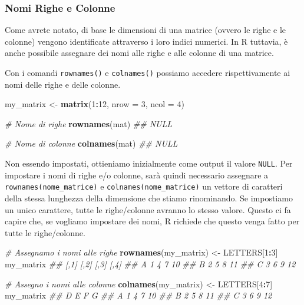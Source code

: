 \documentclass[
]{book}
\newenvironment{Shaded}{\begin{snugshade}}{\end{snugshade}}
\newcommand{\CommentTok}[1]{\textcolor[rgb]{0.56,0.35,0.01}{\textit{#1}}}
\newcommand{\DataTypeTok}[1]{\textcolor[rgb]{0.13,0.29,0.53}{#1}}
\newcommand{\DecValTok}[1]{\textcolor[rgb]{0.00,0.00,0.81}{#1}}
\newcommand{\KeywordTok}[1]{\textcolor[rgb]{0.13,0.29,0.53}{\textbf{#1}}}
\newcommand{\NormalTok}[1]{#1}
\newcommand{\OperatorTok}[1]{\textcolor[rgb]{0.81,0.36,0.00}{\textbf{#1}}}
\newcommand{\StringTok}[1]{\textcolor[rgb]{0.31,0.60,0.02}{#1}}
\begin{document}
\hypertarget{nomi-righe-e-colonne}{%
\subsubsection*{Nomi Righe e Colonne}\label{nomi-righe-e-colonne}}

Come avrete notato, di base le dimensioni di una matrice (ovvero le righe e le colonne) vengono identificate attraverso i loro indici numerici. In R tuttavia, è anche possibile assegnare dei nomi alle righe e alle colonne di una matrice.

Con i comandi \texttt{rownames()} e \texttt{colnames()} possiamo accedere rispettivamente ai nomi delle righe e delle colonne.

\begin{Shaded}
\begin{Highlighting}[]
\NormalTok{my_matrix <-}\StringTok{ }\KeywordTok{matrix}\NormalTok{(}\DecValTok{1}\OperatorTok{:}\DecValTok{12}\NormalTok{, }\DataTypeTok{nrow =} \DecValTok{3}\NormalTok{, }\DataTypeTok{ncol =} \DecValTok{4}\NormalTok{)}

\CommentTok{# Nome di righe}
\KeywordTok{rownames}\NormalTok{(mat)}
\CommentTok{## NULL}

\CommentTok{# Nome di colonne}
\KeywordTok{colnames}\NormalTok{(mat)}
\CommentTok{## NULL}
\end{Highlighting}
\end{Shaded}

Non essendo impostati, ottieniamo inizialmente come output il valore \texttt{NULL}. Per impostare i nomi di righe e/o colonne, sarà quindi necessario assegnare a \texttt{rownames(nome\_matrice)} e \texttt{colnames(nome\_matrice)} un vettore di caratteri della stessa lunghezza della dimensione che stiamo rinominando. Se impostiamo un unico carattere, tutte le righe/colonne avranno lo stesso valore. Questo ci fa capire che, se vogliamo impostare dei nomi, R richiede che questo venga fatto per tutte le righe/colonne.

\begin{Shaded}
\begin{Highlighting}[]
\CommentTok{# Assegnamo i nomi alle righe}
\KeywordTok{rownames}\NormalTok{(my_matrix) <-}\StringTok{ }\NormalTok{LETTERS[}\DecValTok{1}\OperatorTok{:}\DecValTok{3}\NormalTok{]}
\NormalTok{my_matrix}
\CommentTok{##   [,1] [,2] [,3] [,4]}
\CommentTok{## A    1    4    7   10}
\CommentTok{## B    2    5    8   11}
\CommentTok{## C    3    6    9   12}

\CommentTok{# Assegno i nomi alle colonne}
\KeywordTok{colnames}\NormalTok{(my_matrix) <-}\StringTok{ }\NormalTok{LETTERS[}\DecValTok{4}\OperatorTok{:}\DecValTok{7}\NormalTok{]}
\NormalTok{my_matrix}
\CommentTok{##   D E F  G}
\CommentTok{## A 1 4 7 10}
\CommentTok{## B 2 5 8 11}
\CommentTok{## C 3 6 9 12}
\end{Highlighting}
\end{Shaded}
\end{document}

